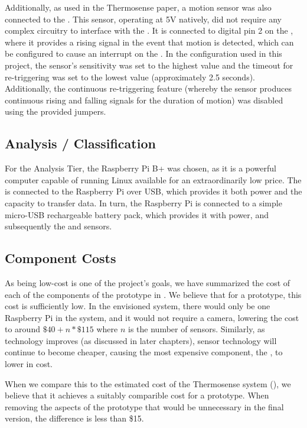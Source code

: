 \documentclass[../thesis/thesis.tex]{subfiles}
\begin{document}
Additionally, as used in the Thermosense paper, a \pir motion sensor \cite{AdafruitPIR} was also connected to the \ard. This sensor, operating at 5V natively, did not require any complex circuitry to interface with the \ard. It is connected to digital pin 2 on the \ard, where it provides a rising signal in the event that motion is detected, which can be configured to cause an interrupt on the \ard. In the configuration used in this project, the sensor's sensitivity was set to the highest value and the timeout for re-triggering was set to the lowest value (approximately 2.5 seconds). Additionally, the continuous re-triggering feature (whereby the sensor produces continuous rising and falling signals for the duration of motion) was disabled using the provided jumpers. 

\subsection{Analysis / Classification}

For the Analysis Tier, the Raspberry Pi B+ was chosen, as it is a powerful computer capable of running Linux available for an extraordinarily low price. The \ard is connected to the Raspberry Pi over USB, which provides it both power and the capacity to transfer data. In turn, the Raspberry Pi is connected to a simple micro-USB rechargeable battery pack, which provides it with power, and subsequently the \ard and sensors.

\subsection{Component Costs}
\label{subsec:cost}
As being low-cost is one of the project's goals, we have summarized the cost of each of the components of the prototype in . We believe that for a prototype, this cost is sufficiently low. In the envisioned system, there would only be one Raspberry Pi in the system, and it would not require a camera, lowering the cost to around $\$40 + n * \$115$ where $n$ is the number of sensors. Similarly, as technology improves (as discussed in later chapters), sensor technology will continue to become cheaper, causing the most expensive component, the \mlx, to lower in cost.

When we compare this to the estimated cost of the Thermosense system (), we believe that it achieves a suitably comparible cost for a prototype. When removing the aspects of the prototype that would be unnecessary in the final version, the difference is less than \$15.
\end{document}
